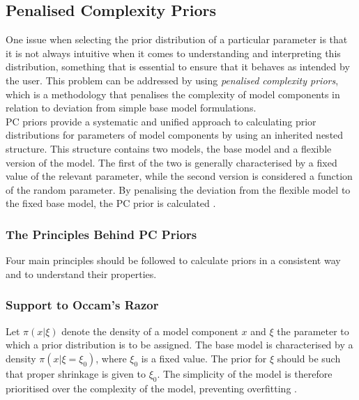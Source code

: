 \subsection{Penalised Complexity Priors}\label{sec:pc_prior}
One issue when selecting the prior distribution of a particular parameter is that it is not always intuitive when it comes to understanding and interpreting this distribution, something that is essential to ensure that it behaves as intended by the user. This problem can be addressed by using \textit{penalised complexity priors}, which is a methodology that penalises the complexity of model components in relation to deviation from simple base model formulations.\\
PC priors provide a systematic and unified approach to calculating prior distributions for parameters of model components by using an inherited nested structure. This structure contains two models, the base model and a flexible version of the model. The first of the two is generally characterised by a fixed value of the relevant parameter, while the second version is considered a function of the random parameter. By penalising the deviation from the flexible model to the fixed base model, the PC prior is calculated \autocite[][]{martins2014penalising}.
\subsubsection{The Principles Behind PC Priors}
Four main principles should be followed to calculate priors in a consistent way and to understand their properties.
\subsubsection*{Support to Occam's Razor} 
Let $\pi\left(x|\xi\right)$ denote the density of a model component $x$ and $\xi$ the parameter to which a prior distribution is to be assigned. The base model is characterised by a density $\pi\left(x|\xi=\xi_0\right)$, where $\xi_0$ is a fixed value. The prior for $\xi$ should be such that proper shrinkage is given to $\xi_0$. The simplicity of the model is therefore prioritised over the complexity of the model, preventing overfitting \autocite[][]{martins2014penalising}.
